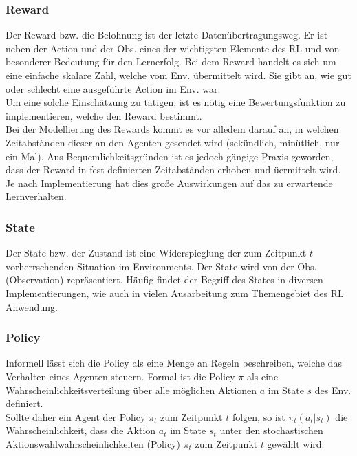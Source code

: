 \subsubsection{Reward}\label{sec:Reward}
Der Reward bzw. die Belohnung ist der letzte Datenübertragungsweg. Er ist neben der Action und der Obs. eines der wichtigsten Elemente des RL und von besonderer Bedeutung für den Lernerfolg.
Bei dem Reward handelt es sich um eine einfache skalare Zahl, welche vom Env. übermittelt wird. Sie gibt an, wie gut oder schlecht eine ausgeführte Action im Env. war. \cite[S. 42]{Sutton1998}\\
Um eine solche Einschätzung zu tätigen, ist es nötig eine Bewertungsfunktion zu implementieren, welche den Reward bestimmt.\\ 
Bei der Modellierung des Rewards kommt es vor alledem darauf an, in welchen Zeitabständen dieser an den Agenten gesendet wird (sekündlich, minütlich, nur ein Mal). Aus Bequemlichkeitsgründen ist es jedoch gängige Praxis geworden, dass der Reward in fest definierten Zeitabständen erhoben und üermittelt wird. \cite[S. 29 f.]{DRL_Lapan}\\
Je nach Implementierung hat dies große Auswirkungen auf das zu erwartende Lernverhalten.

\subsubsection{State}\label{sec:State}
Der State bzw. der Zustand ist eine Widerspieglung der zum Zeitpunkt $t$ vorherrschenden Situation im Environments. 
Der State wird von der Obs. (Observation) repräsentiert. Häufig findet der Begriff des States in diversen Implementierungen, wie auch in vielen Ausarbeitung zum Themengebiet des RL Anwendung. \cite[s. 381 ff.]{Sutton1998}

\subsubsection{Policy} \label{sec:Policy}
Informell lässt sich die Policy als eine Menge an Regeln beschreiben, welche das Verhalten eines Agenten steuern. Formal ist die Policy $\pi$ als eine Wahrscheinlichkeitsverteilung über alle möglichen Aktionen $a$ im State $s$ des Env. definiert. \cite[S. 44]{DRL_Lapan}\\
Sollte daher ein Agent der Policy $\pi_{t}$ zum Zeitpunkt $t$ folgen, so ist $\pi_{t}(a_t|s_t)$ die Wahrscheinlichkeit, dass die Aktion $a_t$ im State $s_t$ unter den stochastischen Aktionswahlwahrscheinlichkeiten (Policy) $\pi_{t}$ zum Zeitpunkt $t$ gewählt wird. 
\cite[S. 45 ff.]{Sutton1998}

